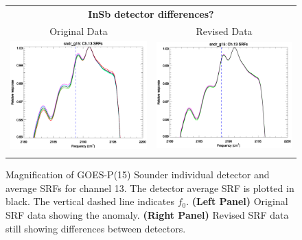 \begin{figure}[htp]
  \centering
  \begin{tabular}{c c}
    \multicolumn{2}{c}{\textsf{\bfseries InSb detector differences?}} \\
    \hspace{1.5em}\textsf{Original Data} &
    \hspace{1.5em}\textsf{Revised Data} \\
    \includegraphics[scale=0.5,trim=0 40 0 0]{graphics/zoom_anomaly/original/sndr_g15.ch13.srf.eps} &
    \includegraphics[scale=0.5,trim=0 40 0 0]{graphics/zoom_anomaly/revised/sndr_g15.ch13.srf.eps} \\\\
  \end{tabular}
  \caption{Magnification of GOES-P(15) Sounder individual detector and average SRFs for channel 13. The detector average SRF is plotted in black. The vertical dashed line indicates $f_0$. \textbf{(Left Panel)} Original SRF data showing the anomaly. \textbf{(Right Panel)}  Revised SRF data still showing differences between detectors.}
  \label{fig:sndr_g15.ch13.anomaly}
\end{figure}

